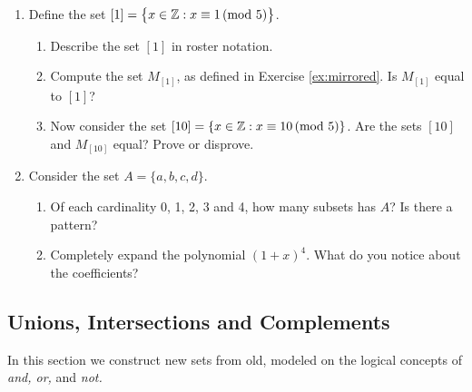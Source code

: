 \begin{exercises}{}{}
\begin{enumerate}
  \item Define the set $[1]=\bigl\{x\in\mathbb{Z}: x\equiv 1\negthickspace\pmod{5}\bigr\}$.
		\begin{enumerate}
		  \item Describe the set $[1]$ in roster notation.
		  \item Compute the set $M_{[1]}$, as defined in Exercise \ref{ex:mirrored}. Is $M_{[1]}$ equal to $[1]$?
			\item Now consider the set $[10]=\{x\in\mathbb{Z}:x\equiv 10\negthickspace\pmod{5}\}$. Are the sets $[10]$ and $M_{[10]}$ equal? Prove or disprove.
  	\end{enumerate}


		\item Consider the set $A=\{a,b,c,d\}$. 
    \begin{enumerate}
      \item Of each cardinality 0, 1, 2, 3 and 4, how many subsets has $A$? Is there a pattern?
        
      \item Completely expand the polynomial $(1 + x)^4$. What do you notice about the coefficients? 
    \end{enumerate}

	\end{enumerate}
\end{exercises}

\clearpage



\subsection{Unions, Intersections and Complements}\label{sec:union}

In this section we construct new sets from old, modeled on the logical concepts of \emph{and, or,} and \emph{not.}


